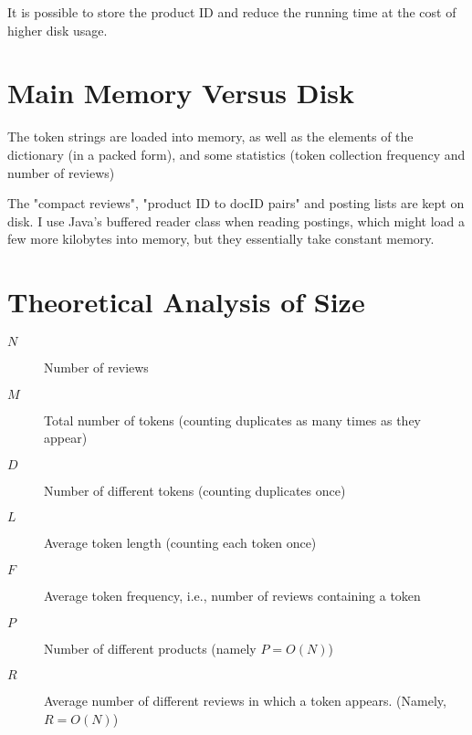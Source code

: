 \documentclass[11pt]{article}
\begin{document}
It is possible to store the product ID and reduce the running time at the cost of higher
disk usage.


\section{Main Memory Versus Disk}

\begin{comment}
{\em Put an explanation of which portions of the index are read into memory when an IndexReader object is created, and which portions will be read as needed. }
\end{comment}

The token strings are loaded into memory, as well as the elements of the dictionary (in a packed form), and some statistics (token collection frequency
and number of reviews)

The "compact reviews", "product ID to docID pairs" and posting lists are kept on disk. I use Java's buffered reader class when reading postings, which
might load a few more kilobytes into memory, but they essentially take constant memory.

\section{Theoretical Analysis of Size}

\begin{comment}
{\em Theoretically analyze the expected size (in bytes) of all of your index structures. In your
  analysis, the size of the index should be a function of the size of the
  input.  Use the following variables to denote the various input size parameters:
}
\end{comment}
  \begin{description}
      \item[$N$] Number of reviews
      \item[$M$] Total number of tokens (counting duplicates as many times as they appear)
      \item[$D$] Number of different tokens (counting duplicates once)
      \item[$L$] Average token length (counting each token once)
      \item[$F$] Average token frequency, i.e., number of reviews containing a token
      \item[$P$] Number of different products (namely $P = O(N)$)
      \item[$R$] Average number of different reviews in which a token appears. (Namely, $R = O(N)$)
  \end{description}
\end{document}
